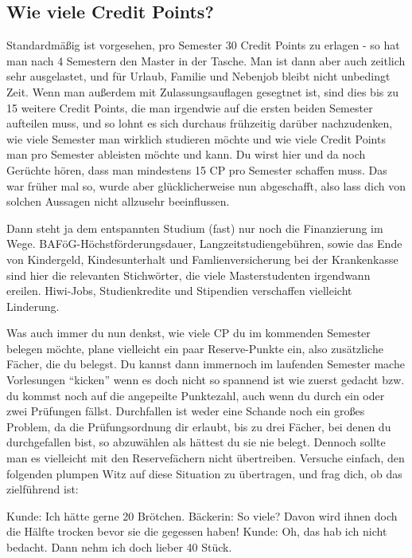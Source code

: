 \subsection{Wie viele Credit Points?}
Standardmäßig ist vorgesehen, pro Semester 30 Credit Points zu erlagen - so hat man nach 4 Semestern den Master in der Tasche. Man ist dann aber auch zeitlich sehr ausgelastet, und für Urlaub, Familie und Nebenjob bleibt nicht unbedingt Zeit. Wenn man außerdem mit Zulassungsauflagen gesegtnet ist, sind dies bis zu 15 weitere Credit Points, die man irgendwie auf die ersten beiden Semester aufteilen muss, und so lohnt es sich durchaus frühzeitig darüber nachzudenken, wie viele Semester man wirklich studieren möchte und wie viele Credit Points man pro Semester ableisten möchte und kann. Du wirst hier und da noch Gerüchte hören, dass man mindestens 15 CP pro Semester schaffen muss. Das war früher mal so, wurde aber glücklicherweise nun abgeschafft, also lass dich von solchen Aussagen nicht allzusehr beeinflussen.

Dann steht ja dem entspannten Studium (fast) nur noch die Finanzierung im Wege. BAFöG-Höchstförderungsdauer, Langzeitstudiengebühren, sowie das Ende von Kindergeld, Kindesunterhalt und Famlienversicherung bei der Krankenkasse sind hier die relevanten Stichwörter, die viele Masterstudenten irgendwann ereilen. Hiwi-Jobs, Studienkredite und Stipendien verschaffen vielleicht Linderung.

Was auch immer du nun denkst, wie viele CP du im kommenden Semester belegen möchte, plane vielleicht ein paar Reserve-Punkte ein, also zusätzliche Fächer, die du belegst. Du kannst dann immernoch im laufenden Semester mache Vorlesungen "`kicken"' wenn es doch nicht so spannend ist wie zuerst gedacht bzw. du kommst noch auf die angepeilte Punktezahl, auch wenn du durch ein oder zwei Prüfungen fällst. Durchfallen ist weder eine Schande noch ein großes Problem, da die Prüfungsordnung dir erlaubt, bis zu drei Fächer, bei denen du durchgefallen bist, so abzuwählen als hättest du sie nie belegt. Dennoch sollte man es vielleicht mit den Reservefächern nicht übertreiben. Versuche einfach, den folgenden plumpen Witz auf diese Situation zu übertragen, und frag dich, ob das zielführend ist:

Kunde: Ich hätte gerne 20 Brötchen. 
Bäckerin: So viele? Davon wird ihnen doch die Hälfte trocken bevor sie die gegessen haben!
Kunde: Oh, das hab ich nicht bedacht. Dann nehm ich doch lieber 40 Stück.

